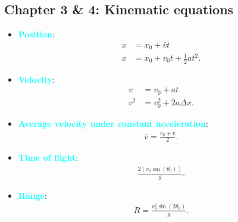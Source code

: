 \documentclass{report}
\begin{document}
    \subsection{Chapter 3 \& 4: Kinematic equations}
    \begin{itemize}
        \item \textbf{\textcolor{cyan}{Position}}:
            \begin{align*}
                x &= x_{0} + \bar{v}t \\
                x &= x_{0} + v_{0}t + \frac{1}{2}at^{2}
            .\end{align*}
        \item \textbf{\textcolor{cyan}{Velocity}}:
            \begin{align*}
                v &= v_{0} + at \\
                v^{2} &= v_{0}^{2} +2a\Delta x
            .\end{align*}
        \item \textbf{\textcolor{cyan}{Average velocity under constant acceleration}}:
            \begin{align*}
                \bar{v} = \frac{v_{0} + v}{2}
            .\end{align*}
        \item \textbf{\textcolor{cyan}{Time of flight}}:
            \begin{align*}
                \frac{2(v_{0}\sin{\left(\theta_{0}\right)})}{g}
            .\end{align*}
        \item \textbf{\textcolor{cyan}{Range}}:
            \begin{align*}
                R = \frac{v_{0}^{2}\sin{\left(2\theta_{0}\right)}}{g}
            .\end{align*}
    \end{itemize}

    \pagebreak 
\end{document}

